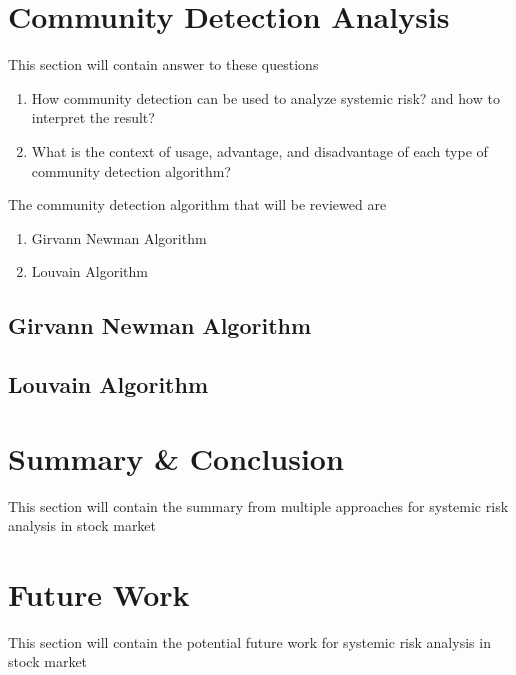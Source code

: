\documentclass[a4paper,11pt]{article}
\begin{document}
\section{Community Detection Analysis}
This section will contain answer to these questions
\begin{enumerate}
    \item How community detection can be used to analyze systemic risk? and how to interpret the result?
    \item What is the context of usage, advantage, and disadvantage of each type of community detection algorithm?
\end{enumerate}

The community detection algorithm that will be reviewed are
\begin{enumerate}
    \item Girvann Newman Algorithm
    \item Louvain Algorithm
\end{enumerate}

\subsection{Girvann Newman Algorithm}
\subsection{Louvain Algorithm}

\section{Summary \& Conclusion}
This section will contain the summary from multiple approaches for systemic risk analysis in stock market

\section{Future Work}
This section will contain the potential future work for systemic risk analysis in stock market



\small
\end{document}
